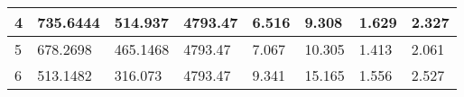 \begin{table}
{\begin{tabular}{|l|l|l|l|l|l|l|l|}
4                                                               & 735.6444                                                                                                  & 514.937                                                                                                    & 4793.47                                                                                                                  & 6.516                                                                                   & 9.308                                                                                    & 1.629                                                                           & 2.327                                                                            \\ \hline
5                                                               & 678.2698                                                                                                  & 465.1468                                                                                                   & 4793.47                                                                                                                  & 7.067                                                                                   & 10.305                                                                                   & 1.413                                                                           & 2.061                                                                            \\ \hline
6                                                               & 513.1482                                                                                                  & 316.073                                                                                                    & 4793.47                                                                                                                  & 9.341                                                                                   & 15.165                                                                                   & 1.556                                                                           & 2.527                                                                            \\ \hline
\end{tabular}}
\end{table}

